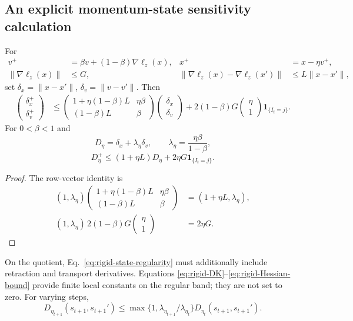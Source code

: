 \subsection{An explicit momentum-state sensitivity calculation}
\begin{proposition}
For
\begin{align}
v^+&=\beta v+(1-\beta)\nabla\ell_z(x),&
x^+&=x-\eta v^+,\\
\|\nabla\ell_z(x)\|&\leq G,&
\|\nabla\ell_z(x)-\nabla\ell_z(x')\|&\leq L\|x-x'\|,
\end{align}
set $\delta_x=\|x-x'\|$, $\delta_v=\|v-v'\|$.
Then
\begin{align}
\begin{pmatrix}\delta_x^+\\\delta_v^+\end{pmatrix}
&\leq
\begin{pmatrix}
1+\eta(1-\beta)L&\eta\beta\\
(1-\beta)L&\beta
\end{pmatrix}
\begin{pmatrix}\delta_x\\\delta_v\end{pmatrix}
+2(1-\beta)G\begin{pmatrix}\eta\\1\end{pmatrix}\mathbf1_{\{I_t=j\}}.
\end{align}
For $0<\beta<1$ and
\begin{equation}
D_\eta=\delta_x+\lambda_\eta\delta_v,\qquad
\lambda_\eta=\frac{\eta\beta}{1-\beta},
\end{equation}
\begin{equation}
D_\eta^+\leq(1+\eta L)D_\eta+2\eta G\mathbf1_{\{I_t=j\}}.
\label{eq:rigid-momentum-stability}
\end{equation}
\end{proposition}
\begin{proof}
The row-vector identity is
\begin{align}
(1,\lambda_\eta)
\begin{pmatrix}
1+\eta(1-\beta)L&\eta\beta\\
(1-\beta)L&\beta
\end{pmatrix}
&=(1+\eta L,\lambda_\eta),\\
(1,\lambda_\eta)\,2(1-\beta)G
\begin{pmatrix}\eta\\1\end{pmatrix}
&=2\eta G .
\end{align}
\end{proof}
On the quotient, Eq.~\eqref{eq:rigid-state-regularity} must additionally
include retraction and transport derivatives. Equations
\eqref{eq:rigid-DK}--\eqref{eq:rigid-Hessian-bound} provide finite local
constants on the regular band; they are not set to zero.
For varying steps,
\begin{equation}
D_{\eta_{t+1}}(s_{t+1},s_{t+1}')
\leq\max\{1,\lambda_{\eta_{t+1}}/\lambda_{\eta_t}\}
D_{\eta_t}(s_{t+1},s_{t+1}').
\end{equation}

